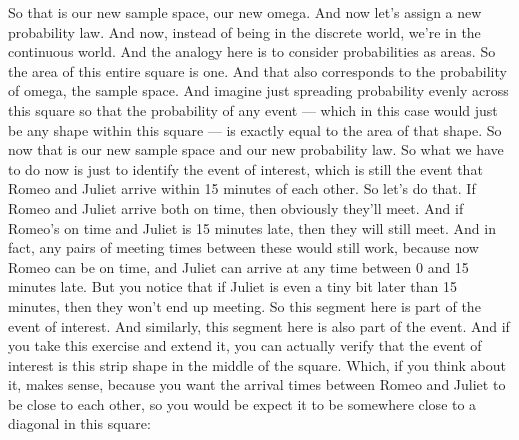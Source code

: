\documentclass[pdftex, brazil, 12pt, twoside]{article}
\begin{document}
So that is our new sample space, our new omega.
And now let's assign a new probability law.
And now, instead of being in the discrete world, we're in
the continuous world.
And the analogy here is to consider
probabilities as areas.
So the area of this entire square is one.
And that also corresponds to the probability of omega, the
sample space.
And imagine just spreading probability evenly across this
square so that the probability of any event ---
which in this case would just be any
shape within this square ---
is exactly equal to the area of that shape.
So now that is our new sample space and our
new probability law.
So what we have to do now is just to identify the event of
interest, which is still the event that Romeo and Juliet
arrive within 15 minutes of each other.
So let's do that.
If Romeo and Juliet arrive both on time, then obviously
they'll meet.
And if Romeo's on time and Juliet is 15 minutes late,
then they will still meet.
And in fact, any pairs of meeting times between these
would still work, because now Romeo can be on time, and
Juliet can arrive at any time between 0 and 15 minutes late.
But you notice that if Juliet is even a tiny bit later than
15 minutes, then they won't end up meeting.
So this segment here is part of the event of interest.
And similarly, this segment here is
also part of the event.
And if you take this exercise and extend it, you can
actually verify that the event of interest is this strip
shape in the middle of the square.
Which, if you think about it, makes sense, because you want
the arrival times between Romeo and Juliet to be close
to each other, so you would be expect it to be somewhere
close to a diagonal in this square:

\begin{figure}[H]
  \begin{center}
  \end{center}
\end{figure}
\end{document}
